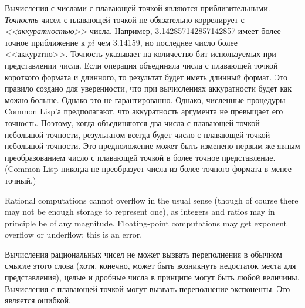Вычисления с числами с плавающей точкой являются приблизительными.
\emph{Точность} чисел с плавающей точкой не обязательно коррелирует с
\emph{<<аккуратностью>>} числа.
Например, 3.142857142857142857 имеет более точное приближение к $pi$ чем
3.14159, но последнее число более <<аккуратно>>.
Точность указывает на количество бит используемых при представлении числа.
Если операция объединяла числа с плавающей точкой короткого формата и длинного,
то результат будет иметь длинный формат. Это правило создано для уверенности,
что при вычислениях аккуратности будет как можно больше. Однако это не
гарантированно.
Однако, численные процедуры Common Lisp'а предполагают, что аккуратность
аргумента не превыщает его точность. Поэтому, когда объединяются два 
числа с плавающей точкой небольшой точности, результатом всегда будет число с
плавающей точкой небольшой точности.
Это предположение может быть изменено первым же явным преобразованием
число с плавающей точкой в более точное представление.
(Common Lisp никогда не преобразует числа из более точного формата в менее точный.)

Rational computations cannot overflow in the usual sense
(though of course there may not be enough storage
to represent one), as integers and ratios may in principle be of any magnitude.
Floating-point computations may get exponent overflow or underflow;
this is an error.

Вычисления рациональных чисел не может вызвать переполнения в обычном смысле
этого слова (хотя, конечно, может быть возникнуть недостаток места для
представления), целые и дробные числа в принципе могут быть любой величины.
Вычисления с плавающей точкой могут вызвать переполнение экспоненты. Это
является ошибкой.


